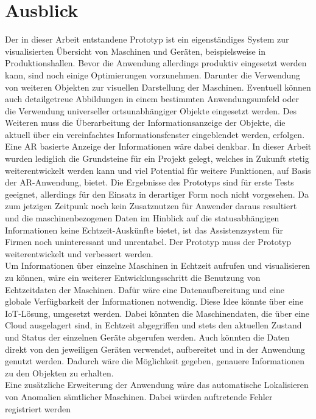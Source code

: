 \chapter{Ausblick}
\label{chap:Ausblick}
Der in dieser Arbeit entstandene Prototyp ist ein eigenständiges System zur visualisierten Übersicht von Maschinen und Geräten, beispielsweise in Produktionshallen. 
Bevor die Anwendung allerdings produktiv eingesetzt werden kann, sind noch einige Optimierungen vorzunehmen. Darunter die Verwendung von weiteren Objekten 
zur visuellen Darstellung der Maschinen. Eventuell können auch detailgetreue Abbildungen in einem bestimmten Anwendungsumfeld oder die Verwendung universeller 
ortsunabhängiger Objekte eingesetzt werden. Des Weiteren muss die Überarbeitung der Informationsanzeige der Objekte, die aktuell über ein vereinfachtes Informationsfenster 
eingeblendet werden, erfolgen. Eine \acl{AR} basierte Anzeige der Informationen wäre dabei denkbar. In dieser Arbeit wurden lediglich die Grundsteine für ein Projekt 
gelegt, welches in Zukunft stetig weiterentwickelt werden kann und viel Potential für weitere Funktionen, auf Basis der \acs{AR}-Anwendung, bietet. Die Ergebnisse 
des Prototyps sind für erste Tests geeignet, allerdings für den %
Einsatz in derartiger Form noch nicht vorgesehen. Da zum jetzigen Zeitpunk noch kein Zusatznutzen für Anwender 
daraus resultiert und die maschinenbezogenen Daten im Hinblick auf die statusabhängigen Informationen keine Echtzeit-Auskünfte bietet, ist das Assistenzsystem für Firmen 
noch uninteressant und unrentabel. Der Prototyp muss der Prototyp weiterentwickelt und verbessert werden. 
\\ 
\linebreak
Um Informationen über einzelne Maschinen in Echtzeit aufrufen und visualisieren zu können, wäre ein weiterer Entwicklungsschritt die Benutzung von Echtzeitdaten der 
Maschinen. Dafür wäre eine Datenaufbereitung und eine globale Verfügbarkeit der Informationen notwendig. Diese Idee könnte über eine \acl{IoT}-Lösung, umgesetzt werden. 
Dabei könnten die Maschinendaten, die über eine Cloud ausgelagert sind, in Echtzeit abgegriffen und stets den aktuellen Zustand und Status der einzelnen Geräte 
abgerufen werden. Auch könnten die Daten direkt von den jeweiligen Geräten verwendet, aufbereitet und in der Anwendung genutzt werden. Dadurch wäre die Möglichkeit 
gegeben, genauere Informationen zu den Objekten zu erhalten.
\\ 
\linebreak
Eine zusätzliche Erweiterung der Anwendung wäre das automatische Lokalisieren von Anomalien sämtlicher Maschinen. Dabei würden auftretende Fehler registriert werden 
